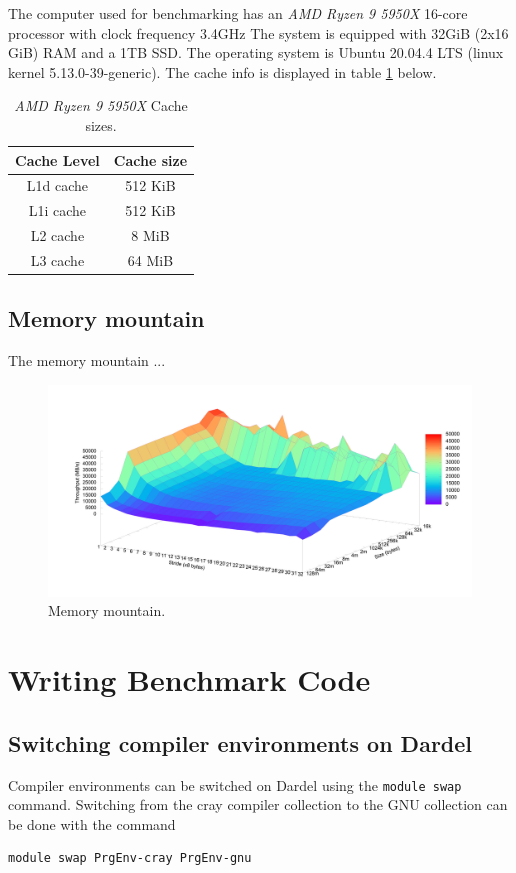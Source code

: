 \documentclass[a4paper, 11pt]{article}
\begin{document}
The computer used for benchmarking has an \textit{AMD Ryzen 9 5950X} 16-core  processor with clock frequency 3.4GHz
The system is equipped with 32GiB (2x16 GiB) RAM and a 1TB SSD. The operating system is Ubuntu 20.04.4 LTS (linux kernel 5.13.0-39-generic).
The cache info is displayed in table \ref{table:cache-sizes} below.
\begin{table}[H]
\centering
\begin{tabular}{|c|c|}
 \hline
 Cache Level &  Cache size \\
 \hline
    L1d cache & 512 KiB \\
    L1i cache & 512 KiB \\
    L2 cache  & 8 MiB \\
    L3 cache  & 64 MiB \\
 \hline
\end{tabular}
\caption{\textit{AMD Ryzen 9 5950X} Cache sizes.}
\label{table:cache-sizes}
\end{table}


\subsection{Memory mountain}
The memory mountain ...
\begin{figure}[H]
\centering
\includegraphics[width=\textwidth]{figures/memory_mountain.png}
\caption{Memory mountain.}
\end{figure}


\section{Writing Benchmark Code}
\subsection{Switching compiler environments on Dardel}
Compiler environments can be switched on Dardel using the \texttt{module swap} command. Switching from the cray compiler collection to the GNU collection
can be done with the command
\begin{lstlisting}
module swap PrgEnv-cray PrgEnv-gnu
\end{lstlisting}
\end{document}
